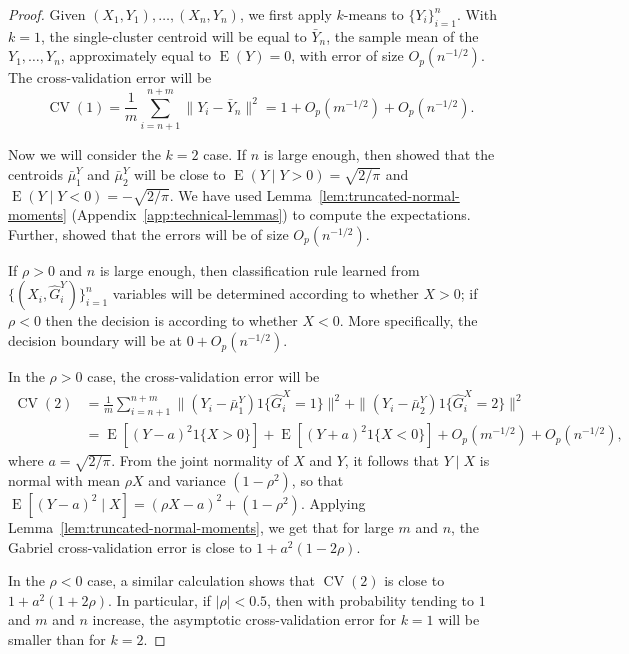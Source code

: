 \documentclass[11pt]{article}
\newcommand{\CV}{\operatorname{CV}}
\newcommand{\E}{\operatorname{E}}
\newcommand{\OhP}{O_p}
\newcommand{\bmuY}{\bar \mu^{Y}}
\newcommand{\hGX}{\hat G^{X}}
\newcommand{\hGY}{\hat G^{Y}}
\begin{document}
\begin{proof}

Given $(X_1, Y_1), \dotsc, (X_n, Y_n)$, we first apply $k$-means to $\{ Y_i
\}_{i=1}^{n}$. With $k = 1$, the single-cluster centroid will
be equal to $\bar Y_n$, the sample mean of the $Y_1, \dotsc, Y_n$, approximately equal to
$\E(Y) = 0$, with error of size $\OhP(n^{-1/2})$. The cross-validation error
will be
\[
  \CV(1) = \frac{1}{m} \sum_{i=n+1}^{n+m} \| Y_i - \bar Y_n \|^2
         = 1 + \OhP(m^{-1/2}) + \OhP(n^{-1/2}).
\]

Now we will consider the $k = 2$ case.  If $n$ is large enough, then
\citet{pollard1981strong} showed that the centroids $\bmuY_1$ and $\bmuY_2$
will be close to $\E(Y \mid Y > 0) = \sqrt{2/\pi}$ and $\E(Y \mid Y < 0) =
-\sqrt{2/\pi}$.  We have used Lemma~\ref{lem:truncated-normal-moments}
(Appendix~\ref{app:technical-lemmas}) to compute the expectations.  Further,
\citet{pollard1982central} showed that the errors will be of size $\OhP(n^{-1/2})$.


If $\rho > 0$ and $n$ is large enough, then classification rule learned from
$\{(X_i, \hGY_i)\}_{i=1}^{n}$ variables will be determined according to
whether $X > 0$; if $\rho < 0$ then the decision is according to whether $X <
0$.  More specifically, the decision boundary will be at $0 + \OhP(n^{-1/2})$.

In the $\rho > 0$ case, the cross-validation error will be
\begin{align*}
  \CV(2)
  &=
    \frac{1}{m}
    \sum_{i=n+1}^{n+m}
      \| (Y_i - \bmuY_1) 1\{\hGX_i = 1\} \|^2
      +
      \| (Y_i - \bmuY_2) 1\{\hGX_i = 2\} \|^2
\\
  &=
    \E[(Y - a)^2 1\{ X > 0\}] + \E[(Y + a)^2 1\{X < 0\}]
      + \OhP(m^{-1/2}) + \OhP(n^{-1/2}),
\end{align*}
where $a = \sqrt{2/\pi}$.  From the joint normality of $X$ and $Y$, it follows
that $Y \mid X$ is normal with mean $\rho X$ and variance $(1 - \rho^2)$, so
that $\E[(Y - a)^2 \mid X] = (\rho X - a)^2 + (1 - \rho^2)$.  Applying
Lemma~\ref{lem:truncated-normal-moments}, we get that for large $m$ and $n$,
the Gabriel cross-validation error is close to
$1 + a^2 (1 - 2 \rho)$.  

In the $\rho < 0$ case, a similar calculation shows that $\CV(2)$ is close to
$1 + a^2 (1 + 2 \rho)$.  In particular, if $|\rho| < 0.5$, then with
probability tending to $1$ and $m$ and $n$ increase, the asymptotic
cross-validation error for $k = 1$ will be smaller than for $k = 2$.
\end{proof}
\end{document}
